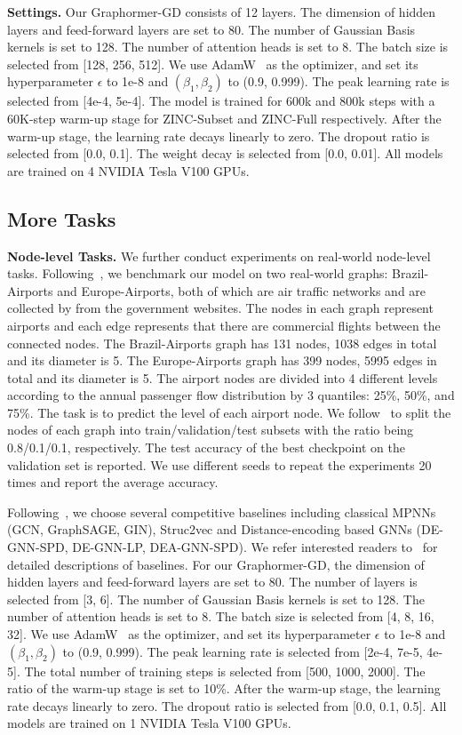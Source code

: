 \documentclass{article} %
\begin{document}
\textbf{Settings.} Our Graphormer-GD consists of 12 layers. The dimension of hidden layers and feed-forward layers are set to 80. The number of Gaussian Basis kernels is set to 128. The number of attention heads is set to 8. The batch size is selected from [128, 256, 512]. We use AdamW~\citep{kingma2014adam} as the optimizer, and set its hyperparameter $\epsilon$ to 1e-8 and $(\beta_1,\beta_2)$ to (0.9, 0.999). The peak learning rate is selected from [4e-4, 5e-4]. The model is trained for 600k and 800k steps with a 60K-step warm-up stage for ZINC-Subset and ZINC-Full respectively. After the warm-up stage, the learning rate decays linearly to zero. The dropout ratio is selected from [0.0, 0.1]. The weight decay is selected from [0.0, 0.01]. All models are trained on 4 NVIDIA Tesla V100 GPUs.


\subsection{More Tasks}
\label{sec:node_task}
\textbf{Node-level Tasks.} We further conduct experiments on real-world node-level tasks. Following~\citet{li2020distance}, we benchmark our model on two real-world graphs: Brazil-Airports and Europe-Airports, both of which are air traffic networks and are collected by \citet{ackland2005mapping} from the government websites. The nodes in each graph represent airports and each edge represents that there are commercial flights between the connected nodes. The Brazil-Airports graph has 131 nodes, 1038 edges in total and its diameter is 5. The Europe-Airports graph has 399 nodes, 5995 edges in total and its diameter is 5. The airport nodes are divided into 4 different levels according to the annual passenger flow distribution by 3 quantiles: 25\%, 50\%, and 75\%. The task is to predict the level of each airport node. We follow~\citet{li2020distance} to split the nodes of each graph into train/validation/test subsets with the ratio being 0.8/0.1/0.1, respectively. The test accuracy of the best checkpoint on the validation set is reported. We use different seeds to repeat the experiments 20 times and report the average accuracy.

Following~\citet{li2020distance}, we choose several competitive baselines including classical MPNNs (GCN, GraphSAGE, GIN), Struc2vec and Distance-encoding based GNNs (DE-GNN-SPD, DE-GNN-LP, DEA-GNN-SPD). We refer interested readers to~\citet{li2020distance} for detailed descriptions of baselines. For our Graphormer-GD, the dimension of hidden layers and feed-forward layers are set to 80. The number of layers is selected from [3, 6]. The number of Gaussian Basis kernels is set to 128. The number of attention heads is set to 8. The batch size is selected from [4, 8, 16, 32]. We use AdamW~\citep{kingma2014adam} as the optimizer, and set its hyperparameter $\epsilon$ to 1e-8 and $(\beta_1,\beta_2)$ to (0.9, 0.999). The peak learning rate is selected from [2e-4, 7e-5, 4e-5]. The total number of training steps is selected from [500, 1000, 2000]. The ratio of the warm-up stage is set to 10\%.  After the warm-up stage, the learning rate decays linearly to zero. The dropout ratio is selected from [0.0, 0.1, 0.5]. All models are trained on 1 NVIDIA Tesla V100 GPUs.
\end{document}
